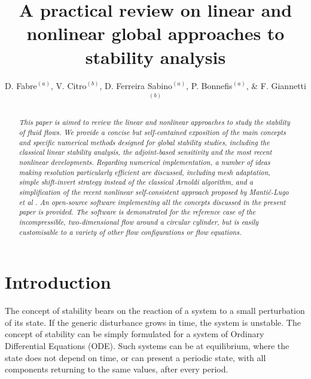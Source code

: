 \documentclass[twocolumn,10pt]{asme2ej}
\title{A {practical} review on linear and nonlinear global approaches to stability analysis}
\author{D. Fabre$^{(a)}$,  V. Citro$^{(b)}$,  D. Ferreira Sabino$^{(a)}$, P. Bonnefis$^{(a)}$,  \& F. Giannetti$^{(b)}$
    \affiliation{
	$^{(a)}$ Institut de Mécanique des fluides de Toulouse (IMFT), University of Toulouse \\
	$^{(b)}$ Dipartimento do Ingegneria (DIIN), Università di Salerno.
    }	
    
}
\begin{document}
\lstset{numbers=left, numberstyle=\small, numbersep=8pt, frame = single, language=Matlab, framexleftmargin=15pt}

\maketitle    

\begin{abstract}
{\it 
This paper is aimed to review the linear and nonlinear approaches to study the stability of fluid flows. 
We provide a concise but self-contained exposition of the main concepts and specific numerical methods 
designed for global stability studies, including the classical linear stability analysis, the adjoint-based sensitivity and  
the most recent nonlinear developments. 
Regarding numerical implementation, a number of ideas making resolution particularly efficient are discussed, 
including mesh adaptation, simple shift-invert strategy instead of the classical Arnoldi algorithm, 
and a simplification of the recent nonlinear self-consistent approach proposed by Manti\v{c}-Lugo et al \cite{MLugo2014}. 
An open-source software implementing all the concepts discussed in the present paper is provided. 
The software is demonstrated for the reference case of the incompressible, two-dimensional flow around a circular cylinder, but is easily customisable to a variety of other flow configurations or flow equations.
}
\end{abstract}



\section{Introduction}

The concept of stability bears on the reaction of a system to a small perturbation of its state. If the generic disturbance grows in time, the system is unstable. The concept of stability can be simply formulated for a system of Ordinary Differential Equations (ODE). 
Such systems can be at equilibrium, where the state does not depend on time, or can present a periodic state, with all components returning to the same values, after every period. 
\end{document}
